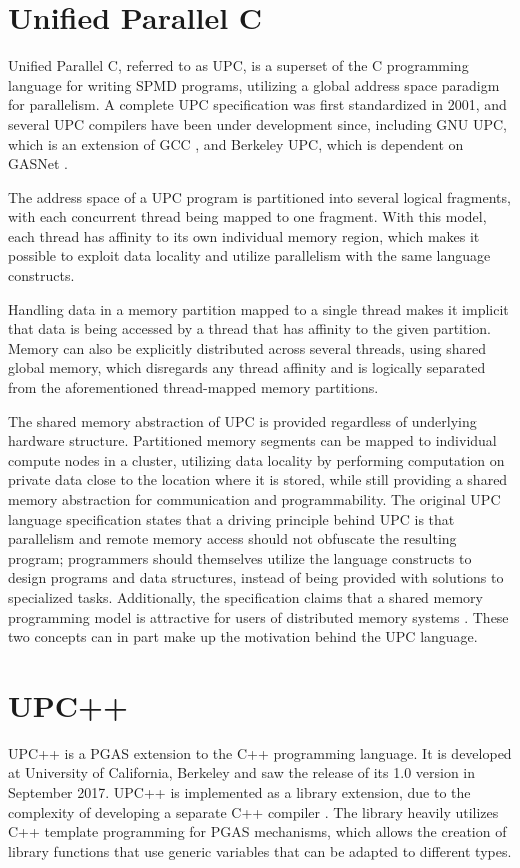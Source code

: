\documentclass{uit-report}
\begin{document}
\section{Unified Parallel C}
Unified Parallel C, referred to as UPC, is a superset of the C programming language for writing SPMD programs, utilizing a global address space paradigm for parallelism. A complete UPC specification was first standardized in 2001, and several UPC compilers have been under development since, including GNU UPC, which is an extension of GCC \cite{web_gnu_upc}, and Berkeley UPC, which is dependent on GASNet \cite{web_berkeley_upc}.

The address space of a UPC program is partitioned into several logical fragments, with each concurrent thread being mapped to one fragment. With this model, each thread has affinity to its own individual memory region, which makes it possible to exploit data locality \cite{evaluation_of_upc} and utilize parallelism with the same language constructs.

Handling data in a memory partition mapped to a single thread makes it implicit that data is being accessed by a thread that has affinity to the given partition. Memory can also be explicitly distributed across several threads, using shared global memory, which disregards any thread affinity and is logically separated from the aforementioned thread-mapped memory partitions.

The shared memory abstraction of UPC is provided regardless of underlying hardware structure. Partitioned memory segments can be mapped to individual compute nodes in a cluster, utilizing data locality by performing computation on private data close to the location where it is stored, while still providing a shared memory abstraction for communication and programmability. The original UPC language specification states that a driving principle behind UPC is that parallelism and remote memory access should not obfuscate the resulting program; programmers should themselves utilize the language constructs to design programs and data structures, instead of being provided with solutions to specialized tasks. Additionally, the specification claims that a shared memory programming model is attractive for users of distributed memory systems \cite{upc_language_specification}. These two concepts can in part make up the motivation behind the UPC language.



\section{UPC++}
UPC++ is a PGAS extension to the C++ programming language. It is developed at University of California, Berkeley and saw the release of its 1.0 version in September 2017. UPC++ is implemented as a library extension, due to the complexity of developing a separate C++ compiler \cite{zheng_kamil_driscoll_shan_yelick_2014}. The library heavily utilizes C++ template programming \cite{web_cpp_template} for PGAS mechanisms, which allows the creation of library functions that use generic variables that can be adapted to different types. 
\end{document}
